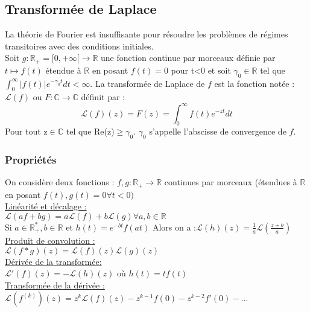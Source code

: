 \documentclass[../main.tex]{subfiles}
\begin{document}
\subsection{Transformée de Laplace}
La théorie de Fourier est insuffisante pour résoudre les problèmes de régimes transitoires avec des conditions initiales.\\

Soit $g:\mathbb{R}_+ = [0, +\infty[ \rightarrow \mathbb{R}$ une fonction continue par morceaux définie par $t\mapsto f(t)$ étendue à $\mathbb{R}$ en posant $f(t) = 0$ pour t<0 et soit $\gamma_0 \in \mathbb{R}$ tel que $\int_0^{\infty} |f(t)| e^{-\gamma_0 t}dt<\infty$. La transformée de Laplace de $f$ est la fonction notée : $\mathcal{L}(f)$ ou $F:\mathbb{C}\rightarrow\mathbb{C}$ définit par :\\
\begin{equation}
    \mathcal{L}(f)(z) = F(z) = \int_0^{\infty} f(t) e^{-zt}dt
\end{equation}
Pour tout z$\in \mathbb{C}$ tel que Re(z)$\geq \gamma_0$. $\gamma_0$ s'appelle l'abscisse de convergence de $f$.\\

\subsubsection{Propriétés}
On considère deux fonctions : $f, g :\mathbb{R}_+ \rightarrow \mathbb{R}$ continues par morceaux (étendues à $\mathbb{R}$ en posant $f(t), g(t) = 0 \forall t<0)$\\

\quad \underline{Linéarité et décalage :}\\
$\mathcal{L}(af+bg) = a\mathcal{L}(f) + b\mathcal{L}(g) \forall a,b\in \mathbb{R}$\\
Si $a\in \mathbb{R}^*_+, b\in \mathbb{R}$ et $h(t) = e^{-bt}f(at)$ Alors on a :$\mathcal{L}(h)(z) = \frac{1}{a} \mathcal{L}(\frac{z+b}{a})$\\

\quad \underline{Produit de convolution :}\\
$\mathcal{L}(f*g)(z) = \mathcal{L}(f)(z)\mathcal{L}(g)(z)$\\

\quad \underline{Dérivée de la transformée:}\\
$\mathcal{L}'(f)(z) = -\mathcal{L}(h)(z)$ où $h(t) = tf(t)$\\

\quad \underline{Transformée de la dérivée :}\\
$\mathcal{L}(f^{(k)})(z) = z^k \mathcal{L}(f)(z) - z^{k-1} f(0) - z^{k-2}f'(0)-\dots$\\
\end{document}
